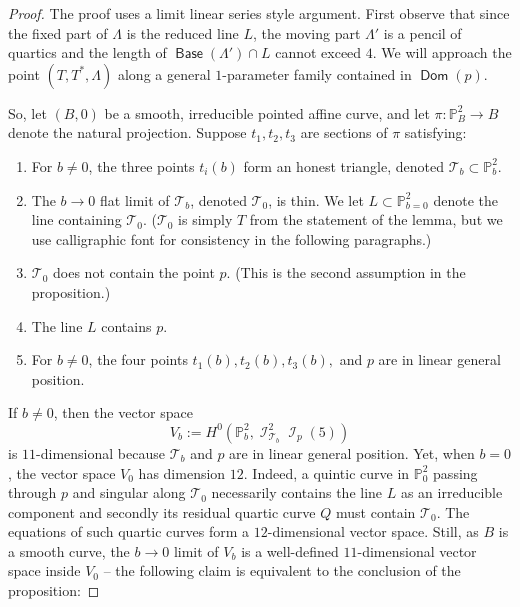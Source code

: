 \documentclass{article}
\renewcommand{\P}{\mathbb{P}}
\DeclareMathOperator{\I}{\mathcal{I}}
\DeclareMathOperator{\Dom}{\mathsf{Dom}}
\DeclareMathOperator{\Base}{\mathsf{Base}}
\begin{document}
\begin{proof}
    The proof uses a limit linear series style argument.  First observe that since the fixed part of $\Lambda$ is the reduced line $L$, the moving part $\Lambda'$ is a pencil of quartics and the length of $\Base(\Lambda')\cap L$ cannot exceed $4$.   We will approach the point $(T,T^{*},\Lambda)$ along a general $1$-parameter family contained in $\Dom(p)$. 
    
    So, let $(B,0)$ be a smooth, irreducible pointed affine curve, and let $\pi: \P^{2}_{B} \to B$ denote the natural projection.  Suppose $t_1, t_2, t_{3}$ are sections of $\pi$ satisfying: 
    \begin{enumerate}
        \item[(a)] For $b \neq 0$, the three points $t_{i}(b)$ form an honest triangle, denoted $\mathcal{T}_{b} \subset \P^{2}_{b}$.
        \item[(b)] The $b \to 0$ flat limit of $\mathcal{T}_{b}$, denoted $\mathcal{T}_{0}$, is thin. We let $L \subset \P^{2}_{b=0}$ denote the line containing $\mathcal{T}_{0}$.  ($\mathcal{T}_{0}$ is simply $T$ from the statement of the lemma, but we use calligraphic font for consistency in the following paragraphs.)
        \item[(c)] $\mathcal{T}_{0}$ does not contain the point $p$. (This is the second assumption in the proposition.)
        \item[(d)] The line $L$ contains $p$.
        \item[(e)] For $b \neq 0$, the four points $t_{1}(b), t_{2}(b), t_{3}(b),$ and $p$ are in linear general position.
    \end{enumerate}

    If $b \neq 0$, then the vector space $$V_{b} := H^{0}\left(\P^{2}_{b}, \I^{2}_{\mathcal{T}_{b}}\I_{p}(5)\right)$$ is $11$-dimensional because $\mathcal{T}_{b}$ and $p$ are in linear general position. Yet, when $b=0$, the vector space $V_{0}$ has dimension $12$.  Indeed, a quintic curve in $\P^{2}_{0}$ passing through $p$ and singular along $\mathcal{T}_{0}$ necessarily contains the line $L$ as an irreducible component and secondly its residual quartic curve $Q$ must contain $\mathcal{T}_{0}$.  The equations of such quartic curves form a $12$-dimensional vector space. Still, as $B$ is a smooth curve, the $b \to 0$ limit of $V_{b}$ is a well-defined $11$-dimensional vector space inside $V_{0}$ -- the following claim is equivalent to the conclusion of the proposition:




\end{proof}
\end{document}
